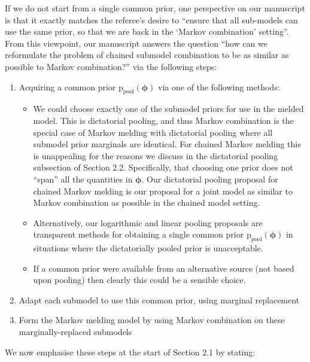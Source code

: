 \documentclass[
  10pt,
  a4paper,
]{article}
\providecommand{\tightlist}{%
  \setlength{\itemsep}{0pt}\setlength{\parskip}{0pt}}
\newcommand{\pd}{\text{p}}
\begin{document}
If we do not start from a single common prior, one perspective on our
manuscript is that it exactly matches the referee's desire to ``ensure
that all sub-models can use the same prior, so that we are back in the
`Markov combination' setting''. From this viewpoint, our manuscript
answers the question ``how can we reformulate the problem of chained
submodel combination to be as similar as possible to Markov
combination?'' via the following steps:

\begin{enumerate}
\def\labelenumi{\arabic{enumi}.}
\tightlist
\item
  Acquiring a common prior \(\pd_{\text{pool}}(\boldsymbol{\phi})\) via
  one of the following methods:

  \begin{itemize}
  \tightlist
  \item
    We could choose exactly one of the submodel priors for use in the
    melded model. This is dictatorial pooling, and thus Markov
    combination is the special case of Markov melding with dictatorial
    pooling where all submodel prior marginals are identical. For
    chained Markov melding this is unappealing for the reasons we
    discuss in the dictatorial pooling subsection of Section 2.2.
    Specifically, that choosing one prior does not ``span'' all the
    quantities in \(\boldsymbol{\phi}\). Our dictatorial pooling
    proposal for chained Markov melding is our proposal for a joint
    model as similar to Markov combination as possible in the chained
    model setting.
  \item
    Alternatively, our logarithmic and linear pooling proposals are
    transparent methods for obtaining a single common prior
    \(\pd_{\text{pool}}(\boldsymbol{\phi})\) in situations where the
    dictatorially pooled prior is unacceptable.
  \item
    If a common prior were available from an alternative source (not
    based upon pooling) then clearly this could be a sensible choice.
  \end{itemize}
\item
  Adapt each submodel to use this common prior, using marginal
  replacement
\item
  Form the Markov melding model by using Markov combination on these
  marginally-replaced submodels
\end{enumerate}

We now emphasise these steps at the start of Section 2.1 by stating:
\end{document}
